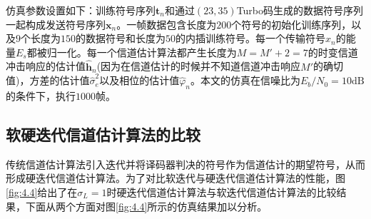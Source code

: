 仿真参数设置如下：训练符号序列$\mathbf{t}_n$和通过$(23,35)$Turbo码生成的数据符号序列一起构成发送符号序列$\mathbf{x}_n$。一帧数据包含长度为$200$个符号的初始化训练序列，以及$9$个长度为$150$的数据符号和长度为$50$的内插训练符号。每一个传输符号$x_n$的能量$E_s$都被归一化。每一个信道估计算法都产生长度为$M={M}'+2=7$的时变信道冲击响应的估计值$\hat{\mathbf{h}}_n$(因为在信道估计的时候并不知道信道冲击响应${M}'$的确切值)，方差的估计值$\hat{\sigma}_e^2$以及相位的估计值$\hat{\varphi}_n$。本文的仿真在信噪比为$E_b/N_0=10\mathrm{dB}$的条件下，执行$1000$帧。
\subsection{软硬迭代信道估计算法的比较}
传统信道估计算法引入迭代并将译码器判决的符号作为信道估计的期望符号，从而形成硬迭代信道估计算法。为了对比软迭代与硬迭代信道估计算法的性能，图\ref{fig:4.4}给出了在$\sigma_L=1$时硬迭代信道估计算法与软迭代信道估计算法的比较结果，下面从两个方面对图\ref{fig:4.4}所示的仿真结果加以分析。

